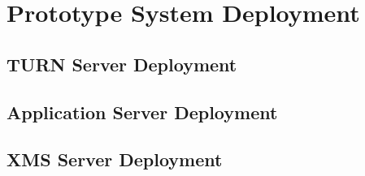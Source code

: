 \chapter{Prototype System Deployment}
\label{chp:sys_deploy}

\section{TURN Server Deployment}

\section{Application Server Deployment}

\section{XMS Server Deployment}